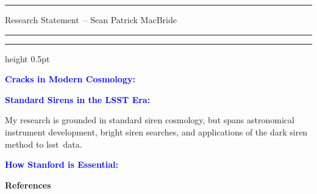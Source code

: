 \documentclass[11pt]{article}
\newcommand{\yourname}{Sean Patrick MacBride}
\newcommand{\hindex}{8}
\newcommand{\hindexDate}{August 2026}
\newcommand{\soptitle}{Research Statement}
\newcommand{\statement}[1]{\par\medskip
  \textcolor{blue}{\textbf{#1:}}%
}
\newcommand{\LSST}{\ac{lsst}}
\begin{document}
\hrule
\begin{center}
    \Large\soptitle\ -- \yourname
\end{center}
\vspace{0pt}
\hrule
\vspace{0.5pt}
\hrule height 0.5pt
\vspace{3pt}

\normalsize
\thispagestyle{plain}
\statement{Cracks in Modern Cosmology}

\statement{Standard Sirens in the LSST Era}
My research is grounded in standard siren cosmology, but spans astronomical instrument development, bright siren searches, and applications of the dark siren method to \LSST\ data.


\statement{How Stanford is Essential}


\newpage

\textbf{References}
\renewcommand{\refname}{}
\vspace{-3\baselineskip}
{\small}
\end{document}
